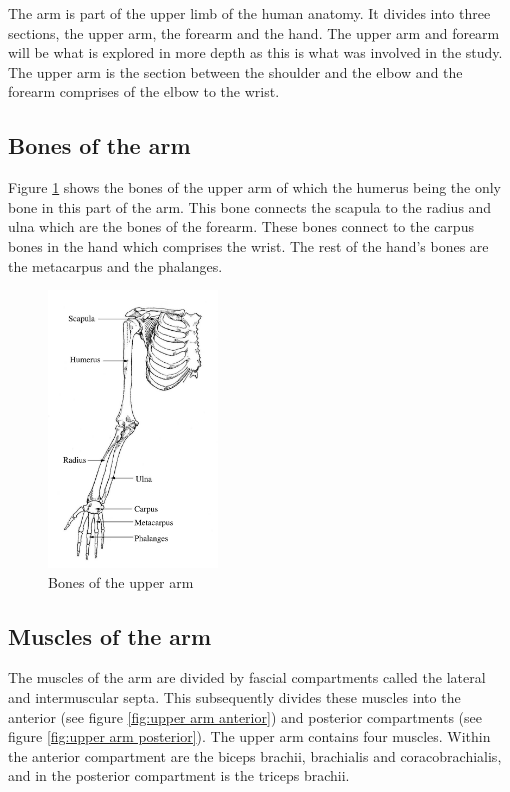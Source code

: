 The arm is part of the upper limb of the human anatomy. It divides into three sections, the upper arm, the forearm and the hand. The upper arm and forearm will be what is explored in more depth as this is what was involved in the study. The upper arm is the section between the shoulder and the elbow and the forearm comprises of the elbow to the wrist. 


\subsection{Bones of the arm}
Figure \ref{fig:upper limb bones} shows the bones of the upper arm of which the humerus being the only bone in this part of the arm. This bone connects the scapula to the radius and ulna which are the bones of the forearm. These bones connect to the carpus bones in the hand which comprises the wrist. The rest of the hand's bones are the metacarpus and the phalanges. 

\begin{figure}[!htpb]
	\centering
	\includegraphics[width=0.4\textwidth,keepaspectratio]{figure_20} 
	\caption{Bones of the upper arm}
	\label{fig:upper limb bones}
\end{figure}


\subsection{Muscles of the arm}
The muscles of the arm are divided by fascial compartments called the lateral and intermuscular septa. This subsequently divides these muscles into the anterior (see figure \ref{fig:upper arm anterior}) and posterior compartments (see figure \ref{fig:upper arm posterior}). The upper arm contains four muscles. Within the anterior compartment are the biceps brachii, brachialis and coracobrachialis, and in the posterior compartment is the triceps brachii. 

